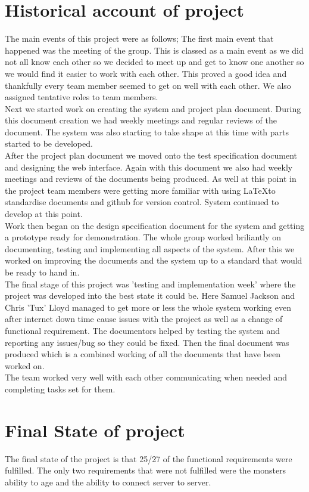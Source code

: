 \documentclass{project}
\begin{document}
\section{Historical account of project}
The main events of this project were as follows;
The first main event that happened was the meeting of the group. This is classed as a main event as we did not all know each other so we decided to meet up and get to know one another so we would find it easier to work with each other. This proved a good idea and thankfully every team member seemed to get on well with each other. We also assigned tentative roles to team members.
\\
Next we started work on creating the system and project plan document. During this document creation we had weekly meetings and regular reviews of the document. The system was also starting to take shape at this time with parts started to be developed. 
\\
After the project plan document we moved onto the test specification document and designing the web interface. Again with this document we also had weekly meetings and reviews of the documents being produced. As well at this point in the project team members were getting more familiar with using \LaTeX to standardise documents and github for version control. System continued to develop at this point.
\\
Work then began on the design specification document for the system and getting a prototype ready for demonstration. The whole group worked briliantly on documenting, testing and implementing all aspects of the system. After this we worked on improving the documents and the system up to a standard that would be ready to hand in.
\\
The final stage of this project was 'testing and implementation week' where the project was developed into the best state it could be. Here Samuel Jackson and Chris 'Tux' Lloyd managed to get more or less the whole system working even after internet down time cause issues with the project as well as a change of functional requirement. The documentors helped by testing the system and reporting any issues/bug so they could be fixed. Then the final document was produced which is a combined working of all the documents that have been worked on.
\\
The team worked very well with each other communicating when needed and completing tasks set for them. 

\section{Final State of project}
The final state of the project is that 25/27 of the functional requirements were fulfilled. The only two requirements that were not fulfilled were the monsters ability to age and the ability to connect server to server. 
\end{document}
